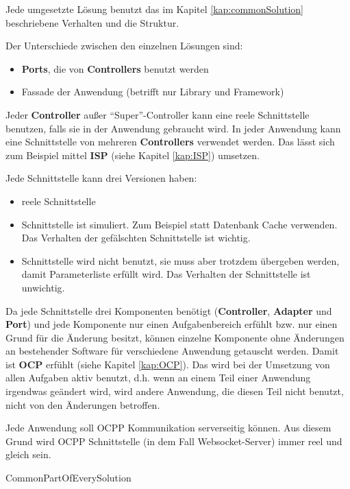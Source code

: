 Jede umgesetzte Lösung benutzt das im Kapitel \ref{kap:commonSolution} beschriebene Verhalten 
und die Struktur. 

Der Unterschiede zwischen den einzelnen Lösungen sind:
\begin{itemize}
    \item \textbf{Ports}, die von \textbf{Controllers} benutzt werden
    \item Fassade der Anwendung (betrifft nur Library und Framework)
\end{itemize}

Jeder \textbf{Controller} außer ``Super''-Controller kann eine reele Schnittstelle benutzen, 
falls sie in der Anwendung gebraucht wird. In jeder Anwendung kann eine Schnittstelle von mehreren \textbf{Controllers} verwendet werden.
Das lässt sich zum Beispiel mittel \textbf{ISP} (siehe Kapitel \ref{kap:ISP}) umsetzen.

Jede Schnittstelle kann drei Versionen haben:
\begin{itemize}
    \item reele Schnittstelle
    \item Schnittstelle ist simuliert. Zum Beispiel statt Datenbank Cache verwenden. Das Verhalten der gefälschten Schnittstelle ist wichtig.
    \item Schnittstelle wird nicht benutzt, sie muss aber trotzdem übergeben werden, 
    damit Parameterliste erfüllt wird. Das Verhalten der Schnittstelle ist unwichtig.
\end{itemize}

Da jede Schnittstelle drei Komponenten benötigt (\textbf{Controller}, \textbf{Adapter} und \textbf{Port}) und jede Komponente nur einen Aufgabenbereich erfühlt
bzw. nur einen Grund für die Änderung besitzt, können einzelne Komponente ohne Änderungen an bestehender Software für verschiedene Anwendung getauscht werden. 
Damit ist \textbf{OCP} erfühlt (siehe Kapitel \ref{kap:OCP}). Das wird bei der Umsetzung von allen Aufgaben aktiv benutzt, d.h. wenn an einem Teil einer Anwendung 
irgendwas geändert wird, wird andere Anwendung, die diesen Teil nicht benutzt, nicht von den Änderungen betroffen.

\newpage
Jede Anwendung soll OCPP Kommunikation serverseitig können. 
Aus diesem Grund wird OCPP Schnittstelle (in dem Fall Websocket-Server) immer reel und gleich sein.

{CommonPartOfEverySolution}